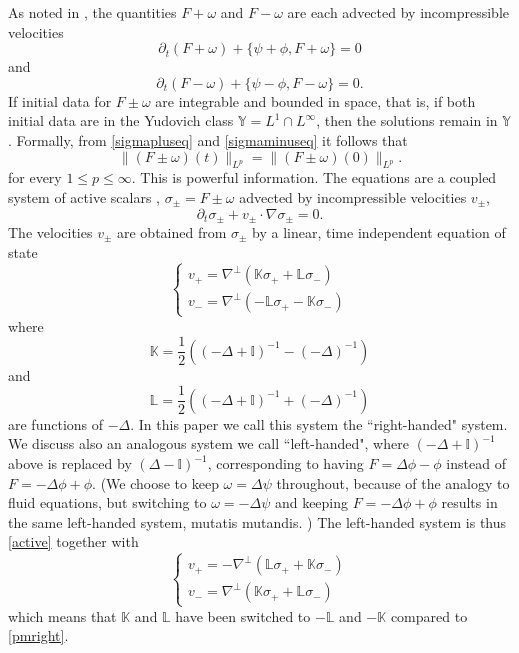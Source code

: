 \documentclass[11pt,reqno]{amsproc}
\newcommand{\pa}{\partial}
\newcommand{\la}{\label}
\newcommand{\fr}{\frac}
\newcommand{\na}{\nabla}
\newcommand{\be}{\begin{equation}}
\newcommand{\ee}{\end{equation}}
\newcommand{\ba}{\begin{array}{l}}
\newcommand{\ea}{\end{array}}
\begin{document}
As noted in \cite{twoplasmas}, the quantities $F+\omega$ and $F-\omega$ are each advected by incompressible velocities
\be
\pa_t (F+\omega) + \{\psi +\phi, F+\omega\} =0
\la{sigmapluseq}
\ee
and
\be
\pa_t (F-\omega) + \{\psi-\phi, F-\omega\} = 0.
\la{sigmaminuseq}
\ee
 If initial data for $F\pm\omega$ are integrable and bounded in space, that is, if both initial data are in the Yudovich class $\mathbb Y = L^1\cap L^{\infty}$, then  the solutions remain in $\mathbb Y$. Formally,
 from \eqref{sigmapluseq} and \eqref{sigmaminuseq} it follows that
 \[
 \|(F\pm\omega)(t)\|_{L^{p}} = \|(F\pm\omega)(0)\|_{L^{p}}.
 \]
 for every $1\le p\le\infty$. This is powerful information.  
 The equations are  a coupled system of active scalars \cite{geoman, siam}, $\sigma_{\pm} = F\pm\omega$ 
 advected by incompressible velocities $v_{\pm}$,
\be
\pa_t \sigma_{\pm} + v_{\pm}\cdot\na\sigma_{\pm} = 0.
\la{active}
\ee 
The velocities $v_{\pm}$ are obtained from $\sigma_{\pm}$ by a linear, time independent equation of state
 \be
 \left\{
 \ba
 v_+ =  \na^{\perp}\left ( \mathbb K \sigma_+ + \mathbb L \sigma_-\right)\\
 v_- = \na^{\perp}\left (-\mathbb L \sigma_+ - \mathbb K \sigma_-\right)
 \ea
 \right.
 \la{pmright}
 \ee
 where 
 \be
 \mathbb K  = \fr{1}{2}\left ( (-\Delta + \mathbb I)^{-1} - (-\Delta)^{-1}\right)
 \la{mathbbK}
 \ee
 and
 \be
 \mathbb L   = \fr{1}{2}\left ( (-\Delta +\mathbb I)^{-1} + (-\Delta)^{-1}\right )
 \la{mathbbL}
 \ee 
 are functions of $-\Delta$. In this paper we call this system the ``right-handed" system. We discuss also an analogous system we call ``left-handed", where $(-\Delta + \mathbb I)^{-1} $ above is replaced by $(\Delta - \mathbb I)^{-1}$, corresponding to having $F = \Delta\phi -\phi$ instead of $F = -\Delta \phi + \phi$. 
 (We choose to keep $\omega = \Delta\psi$ throughout, because of the analogy to fluid equations,  but switching to $\omega = -\Delta\psi$ and keeping $F = -\Delta \phi + \phi$ results in the same left-handed system, mutatis mutandis. ) 
The left-handed system is thus \eqref{active} together with
\be
 \left\{
 \ba
 v_+ =  -\na^{\perp}\left ( \mathbb L \sigma_+ + \mathbb K \sigma_-\right)\\
 v_- = \na^{\perp}\left (\mathbb K \sigma_+  +  \mathbb L \sigma_-\right)
 \ea
 \right.
 \la{pmleft}
 \ee
which means that  $\mathbb K$ and $\mathbb L$ have been  switched to $-\mathbb L$ and $-\mathbb K$ compared to \eqref{pmright}.
\end{document}
